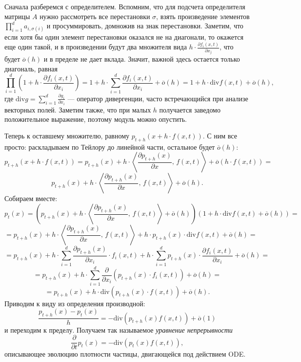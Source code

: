 \documentclass[12pt]{article}
\theoremstyle{definition}
\begin{document}
Сначала разберемся с определителем. Вспомним, что для подсчета определителя матрицы $A$ нужно рассмотреть все перестановки $\sigma$, взять произведение элементов $\prod_{i = 1}^{d} a_{i, \sigma(i)}$ и просуммировать, домножив на знак перестановки. Заметим, что если хотя бы один элемент перестановки оказался не на диагонали, то окажется еще один такой, и в произведении будут два множителя вида $h \cdot \frac{\partial f_i(x, t)}{\partial x_j}$, что будет $\overline{o}(h)$ и в пределе не дает вклада. Значит, важной здесь остается только диагональ, равная
\[
    \prod\limits_{i = 1}^{d} \left(1 + h \cdot \frac{\partial f_i(x, t)}{\partial x_i}\right) = 1 + h \cdot \sum\limits_{i = 1}^{d} \frac{\partial f_i(x, t)}{\partial x_i} + \overline{o}(h) = 1 + h \cdot \text{div} f(x, t) + \overline{o}(h),
\]
где $\text{div} g = \sum_{i = 1}^{d} \frac{\partial g_i}{\partial x_i}$ --- оператор дивергенции, часто встречающийся при анализе векторных полей. Заметим также, что при малых $h$ получается заведомо положительное выражение, поэтому модуль можно опустить.

Теперь к оставшему множителю, равному $p_{t + h}(x + h \cdot f(x, t))$. С ним все просто: раскладываем по Тейлору до линейной части, остальное будет $\overline{o}(h)$:
\[
    p_{t + h}(x + h \cdot f(x, t)) = p_{t + h}(x) + h \cdot \left \langle \frac{\partial p_{t + h}(x)}{\partial x},\, f(x, t)\right\rangle + \overline{o}(h \cdot f(x, t)) =
\]
\[
    p_{t + h}(x) + h \cdot \left \langle \frac{\partial p_{t + h}(x)}{\partial x},\, f(x, t)\right\rangle + \overline{o}(h).
\]
Собираем вместе:
\[
    p_t(x) = \left(p_{t + h}(x) + h \cdot \left \langle \frac{\partial p_{t + h}(x)}{\partial x},\, f(x, t)\right\rangle + \overline{o}(h)\right)\left(1 + h \cdot \text{div} f(x, t) + \overline{o}(h)\right) =
\]
\[
    = p_{t + h}(x) + h \cdot \left \langle \frac{\partial p_{t + h}(x)}{\partial x},\, f(x, t)\right\rangle + h \cdot p_{t + h}(x) \cdot \text{div} f(x, t) + \overline{o}(h) = 
\]
\[
    = p_{t + h}(x) + h \cdot \sum\limits_{i = 1}^{d} \frac{\partial p_{t + h}(x)}{\partial x_i} \cdot f_i(x, t) + h \cdot \sum\limits_{i = 1}^{d} p_{t + h}(x) \cdot \frac{\partial f_i(x, t)}{\partial x_i} + \overline{o}(h) = 
\]
\[
    = p_{t + h}(x) + h \cdot \sum\limits_{i = 1}^{d}\frac{\partial}{\partial x_i} \left( p_{t + h}(x) \cdot f_i(x, t) \right) + \overline{o}(h) =
\]
\[
    = p_{t + h}(x) + h \cdot \text{div}\left(p_{t + h}(x) \cdot f(x, t) \right) + \overline{o}(h).
\]
Приводим к виду из определения производной:
\[
    \frac{p_{t + h}(x) - p_t(x)}{h} = - \text{div}(p_{t + h}(x) f(x, t)) + \overline{o}(1)
\]
и переходим к пределу. Получаем так называемое \emph{уравнение непрерывности}
\begin{equation}
    \frac{\partial}{\partial t} p_t(x) = - \text{div}\left(p_t(x)  f(x, t) \right),
\end{equation}
описывающее эволюцию плотности частицы, двигающейся под действием ODE.
\end{document}
